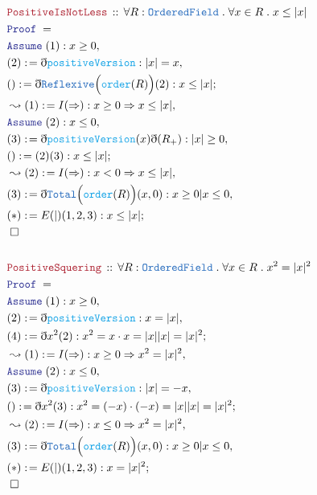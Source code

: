 \documentclass[12pt]{scrartcl}
\newcommand{\TYPE}[1]{\textcolor{NavyBlue}{\mathtt{#1}}}
\newcommand{\FUNC}[1]{\textcolor{Cerulean}{\mathtt{#1}}}
\newcommand{\LOGIC}[1]{\textcolor{Blue}{\mathtt{#1}}}
\newcommand{\THM}[1]{\textcolor{Maroon}{\mathtt{#1}}}
\renewcommand{\.}{\; . \;}
\newcommand{\de}{: \kern 0.1pc =}
\newcommand{\Theorem}[2]{& \THM{#1} \, :: \, #2 \\ & \Proof = \\ }
\newcommand{\Page}[1]{ \begin{align*} #1 \end{align*}   }
\newcommand{ \bd }{ \ByDef }
\newcommand{\Say}[3]{& #1 \de #2 : #3, \\}
\newcommand{\Conclude}[3]{& #1 \de #2 : #3; \\}
\newcommand{\Derive}[3]{& \leadsto #1 \de #2 : #3, \\}
\newcommand{\A}{\LOGIC{Assume} \;}
\newcommand{\Assume}[2]{& \A #1 : #2, \\}
\newcommand{\QED}{\; \square}
\newcommand{\EndProof}{& \QED \\}
\newcommand{\ByDef}{\eth}
\newcommand{\Proof}{\LOGIC{Proof} \; }
\newcommand{\OF}{\TYPE{OrderedField}}
\begin{document}
\Page{
\Theorem{PositiveIsNotLess}{\forall R : \OF \. \forall x \in R \. x \le |x|}
\Assume{(1)}{x \ge 0}
\Say{(2)}{\bd \FUNC{positiveVersion}}{|x| = x}
\Conclude{()}{\bd \TYPE{Reflexive}\Big( \FUNC{order}(R) \Big)(2)}{ x \le |x|  }
\Derive{(1)}{I(\Rightarrow)}{ x \ge 0 \Rightarrow x \le |x|  }
\Assume{(2)}{x \le 0}
\Say{(3)}{\bd \FUNC{positiveVersion}(x) \bd(R_+)}{|x| \ge 0}
\Conclude{()}{(2)(3)}{ x \le |x| }
\Derive{(2)}{I(\Rightarrow)}{x < 0 \Rightarrow x \le |x|}
\Say{(3)}{\bd \TYPE{Total}\Big(\FUNC{order}(R)\Big)(x,0)}{ x \ge 0 | x \le 0}
\Conclude{(*)}{E(|)(1,2,3)}{ x \le |x| }
\EndProof
\\
\Theorem{PositiveSquering}{\forall R : \OF \. \forall x \in R \.  x^2  = |x|^2}
\Assume{(1)}{x \ge 0}
\Say{(2)}{\bd \FUNC{positiveVersion}}{x = |x|}
\Conclude{(4)}{\bd x^2 (2)}{   x^2  = x\cdot x = |x||x| = |x|^2  }
\Derive{(1)}{I(\Rightarrow)}{ x \ge 0 \Rightarrow x^2 = |x|^2  }
\Assume{(2)}{x \le 0 }
\Say{(3)}{\bd \FUNC{positiveVersion}}{|x| = -x}
\Conclude{()}{\bd x^2(3)}{ x^2 = (-x) \cdot (-x) = |x||x| = |x|^2  }
\Derive{(2)}{I(\Rightarrow)}{x \le 0 \Rightarrow x^2 = |x|^2}
\Say{(3)}{\bd \TYPE{Total}\Big(\FUNC{order}(R)\Big)(x,0)}{ x \ge 0 | x \le 0}
\Conclude{(*)}{E(|)(1,2,3)}{ x = |x|^2 }
\EndProof
}
\end{document}
